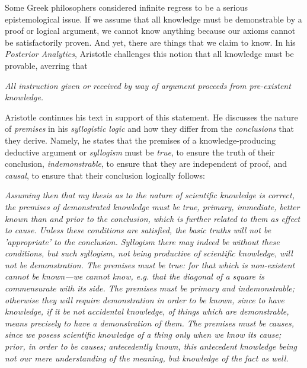 Some Greek philosophers considered infinite regress to be a serious epistemological issue. If we assume that all knowledge must be demonstrable by a proof or logical argument, we cannot know anything because our axioms cannot be satisfactorily proven. And yet, there are things that we claim to know. In his \textit{Posterior Analytics}, Aristotle challenges this notion that all knowledge must be provable, averring that \\

\begin{displayquote}
	\textit{All instruction given or received by way of argument proceeds from pre-existent knowledge.}
	\vspace{4mm}
\end{displayquote} 

Aristotle continues his text in support of this statement. He discusses the nature of \textit{premises} in his \textit{syllogistic logic} and how they differ from the \textit{conclusions} that they derive. Namely, he states that the premises of a knowledge-producing deductive argument or \textit{syllogism} must be \textit{true}, to ensure the truth of their conclusion, \textit{indemonstrable}, to ensure that they are independent of proof, and \textit{causal}, to ensure that their conclusion logically follows: \\

\begin{displayquote}
	\textit{Assuming then that my thesis as to the nature of scientific knowledge is correct, the premises of demonstrated knowledge must be true, primary, immediate, better known than and prior to the conclusion, which is further related to them as effect to cause. Unless these conditions are satisfied, the basic truths will not be 'appropriate' to the conclusion. Syllogism there may indeed be without these conditions, but such syllogism, not being productive of scientific knowledge, will not be demonstration. The premises must be true: for that which is non-existent cannot be known---we cannot know, e.g. that the diagonal of a square is commensurate with its side. The premises must be primary and indemonstrable; otherwise they will require demonstration in order to be known, since to have knowledge, if it be not accidental knowledge, of things which are demonstrable, means precisely to have a demonstration of them. The premises must be causes, since we posess scientific knowledge of a thing only when we know its cause; prior, in order to be causes; antecedently known, this antecedent knowledge being not our mere understanding of the meaning, but knowledge of the fact as well.}
	\vspace{4mm}
\end{displayquote}

